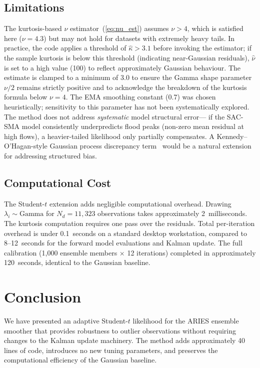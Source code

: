 \documentclass[article,nojss]{jss}
\begin{document}
\subsection{Limitations}

The kurtosis-based $\nu$ estimator~(\ref{eq:nu_est}) assumes $\nu > 4$,
which is satisfied here ($\nu = 4.3$) but may not hold for datasets with
extremely heavy tails.
In practice, the code applies a threshold of $\hat{\kappa} > 3.1$ before
invoking the estimator; if the sample kurtosis is below this threshold
(indicating near-Gaussian residuals), $\hat{\nu}$ is set to a high value
(100) to reflect approximately Gaussian behaviour.
The estimate is clamped to a minimum of 3.0 to ensure the Gamma shape
parameter $\nu/2$ remains strictly positive and to acknowledge the
breakdown of the kurtosis formula below $\nu = 4$.
The EMA smoothing constant (0.7) was chosen heuristically; sensitivity to
this parameter has not been systematically explored.
The method does not address \emph{systematic} model structural error---
if the SAC-SMA model consistently underpredicts flood peaks (non-zero
mean residual at high flows), a heavier-tailed likelihood only partially
compensates.
A Kennedy--O'Hagan-style Gaussian process discrepancy
term~\cite{Kennedy2001} would be a natural extension for addressing
structured bias.

\subsection{Computational Cost}

The Student-$t$ extension adds negligible computational overhead.
Drawing $\lambda_i \sim \text{Gamma}$ for
$N_d = 11{,}323$ observations takes approximately 2~milliseconds.
The kurtosis computation requires one pass over the residuals.
Total per-iteration overhead is under 0.1~seconds on a standard desktop
workstation, compared to 8--12~seconds for the forward model evaluations
and Kalman update.
The full calibration (1,000 ensemble members $\times$ 12 iterations)
completed in approximately 120~seconds, identical to the Gaussian
baseline.

\section{Conclusion}

We have presented an adaptive Student-$t$ likelihood for the ARIES
ensemble smoother that provides robustness to outlier observations
without requiring changes to the Kalman update machinery.
The method adds approximately 40 lines of code, introduces no new
tuning parameters, and preserves the computational efficiency of the
Gaussian baseline.
\end{document}
